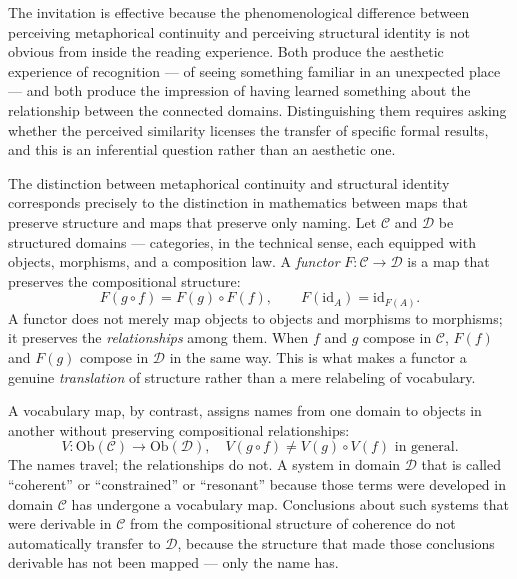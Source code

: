 \documentclass[12pt, openright, twoside]{book}
\begin{document}
The invitation is effective because the
phenomenological difference between perceiving
metaphorical continuity and perceiving structural
identity is not obvious from inside the reading
experience. Both produce the aesthetic experience
of recognition --- of seeing something familiar
in an unexpected place --- and both produce the
impression of having learned something about
the relationship between the connected domains.
Distinguishing them requires asking whether
the perceived similarity licenses the transfer
of specific formal results, and this is an
inferential question rather than an aesthetic one.





\begin{technicalnote}[title={Technical Note: Structure-Preserving Maps and Vocabulary Maps}]

The distinction between metaphorical continuity and structural identity corresponds
precisely to the distinction in mathematics between maps that preserve structure and
maps that preserve only naming. Let $\mathcal{C}$ and $\mathcal{D}$ be structured
domains --- categories, in the technical sense, each equipped with objects, morphisms,
and a composition law. A \emph{functor} $F : \mathcal{C} \to \mathcal{D}$ is a
map that preserves the compositional structure:
\[
F(g \circ f) = F(g) \circ F(f), \qquad F(\mathrm{id}_A) = \mathrm{id}_{F(A)}.
\]
A functor does not merely map objects to objects and morphisms to morphisms; it
preserves the \emph{relationships} among them. When $f$ and $g$ compose in
$\mathcal{C}$, $F(f)$ and $F(g)$ compose in $\mathcal{D}$ in the same way. This
is what makes a functor a genuine \emph{translation} of structure rather than a
mere relabeling of vocabulary.

A vocabulary map, by contrast, assigns names from one domain to objects in another
without preserving compositional relationships:
\[
V : \mathrm{Ob}(\mathcal{C}) \to \mathrm{Ob}(\mathcal{D}), \quad
V(g \circ f) \neq V(g) \circ V(f) \text{ in general.}
\]
The names travel; the relationships do not. A system in domain $\mathcal{D}$ that
is called ``coherent'' or ``constrained'' or ``resonant'' because those terms were
developed in domain $\mathcal{C}$ has undergone a vocabulary map. Conclusions about
such systems that were derivable in $\mathcal{C}$ from the compositional structure
of coherence do not automatically transfer to $\mathcal{D}$, because the structure
that made those conclusions derivable has not been mapped --- only the name has.


\end{technicalnote}
\end{document}
